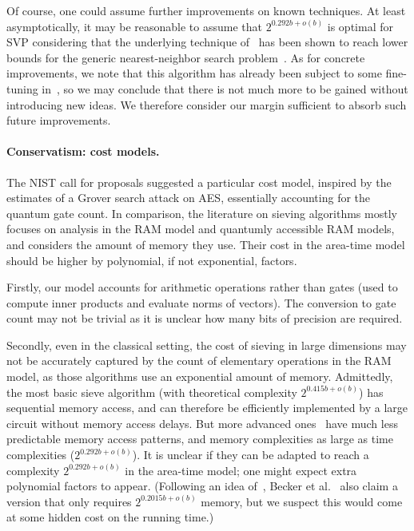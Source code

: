 \documentclass{iacrcc}
\begin{document}
Of course, one could assume further improvements on known techniques.
At least asymptotically, it may be reasonable to assume that
$2^{0.292 b + o(b)}$ is optimal for SVP considering that the
underlying technique of~\cite{SODA:BDGL16} has been shown to reach
lower bounds for the generic nearest-neighbor search
problem~\cite{SODA:ALRW17}.  As for concrete improvements, we note
that this algorithm has already been subject to some fine-tuning
in~\cite{mariano2017parallel}, so we may conclude that there is not
much more to be gained without introducing new ideas. We therefore
consider our margin sufficient to absorb such future improvements.

\paragraph{Conservatism: cost models.}

The NIST call for proposals suggested a particular cost model,
inspired by the estimates of a Grover search attack on AES,
essentially accounting for the quantum gate count. In comparison, the
literature on sieving algorithms mostly focuses on analysis in the RAM
model and quantumly accessible RAM models, and considers the amount of
memory they use. Their cost in the area-time model should be higher by
polynomial, if not exponential, factors.

Firstly, our model accounts for arithmetic operations rather than
gates (used to compute inner products and evaluate norms of
vectors). The conversion to gate count may not be trivial as it is
unclear how many bits of precision are required.

Secondly, even in the classical setting, the cost of sieving in large
dimensions may not be accurately captured by the count of elementary
operations in the RAM model, as those algorithms use an exponential
amount of memory. Admittedly, the most basic sieve algorithm (with
theoretical complexity $2^{0.415b + o(b)}$) has sequential memory
access, and can therefore be efficiently implemented by a large
circuit without memory access delays. But more advanced
ones~\cite{SODA:BDGL16} have much less predictable memory access
patterns, and memory complexities as large as time complexities
($2^{0.292 b + o(b)}$). It is unclear if they can be adapted to reach
a complexity $2^{0.292 b + o(b)}$ in the area-time model; one might
expect extra polynomial factors to appear. (Following an idea
of~\cite{EPRINT:BecGamJou15}, Becker et al.~\cite{SODA:BDGL16} also
claim a version that only requires $2^{0.2015b + o(b)}$ memory, but
we suspect this would come at some hidden cost on the running time.)
\end{document}
